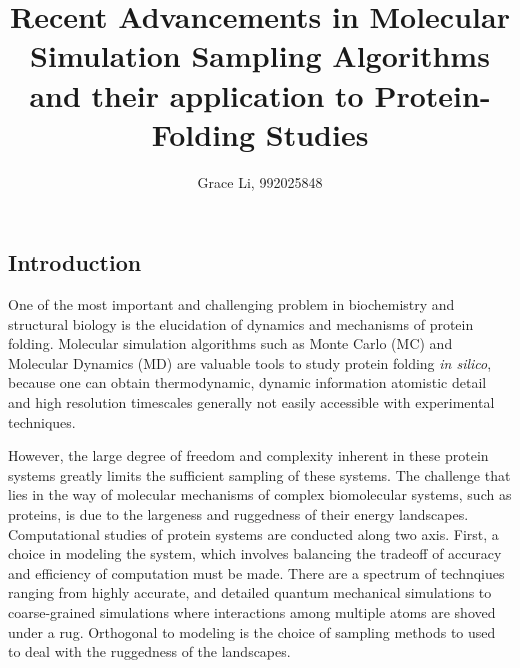 \documentclass[12pt]{article}
\title{Recent Advancements in Molecular Simulation Sampling Algorithms and their application to Protein-Folding Studies}
\author{Grace Li, 992025848}
\numberwithin{equation}{subsection}
\begin{document}
\maketitle

\begin{spacing}{1}

\section{Introduction}
One of the most important and challenging problem in biochemistry and structural biology is the elucidation of dynamics and mechanisms of protein
folding.  Molecular simulation algorithms such as Monte Carlo (MC) and Molecular Dynamics (MD) are valuable tools to study protein folding \textit{in silico}, because one can obtain thermodynamic, dynamic information atomistic detail and high resolution timescales generally not easily accessible with experimental techniques.

However, the large degree of freedom and complexity inherent in these protein systems greatly limits the sufficient sampling of these systems.  The challenge that lies in the way of molecular mechanisms of complex biomolecular systems, such as proteins, is due to the largeness and ruggedness of their energy landscapes.  Computational studies of protein systems are conducted along two axis. First, a choice in modeling the system, which involves balancing the tradeoff of accuracy and efficiency of computation must be made. There are a spectrum of technqiues ranging from highly accurate, and detailed quantum mechanical simulations to coarse-grained simulations where interactions among multiple atoms are shoved under a rug.  Orthogonal to modeling is the choice of sampling methods to used to deal with the ruggedness of the landscapes.


\end{spacing}
\end{document}
